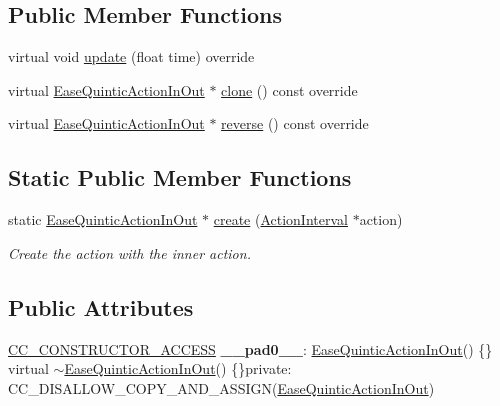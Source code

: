 \subsection*{Public Member Functions}
\begin{DoxyCompactItemize}
\item 
virtual void \hyperlink{classEaseQuinticActionInOut_ada59f8dcd6ba1daeaa1fb9d5b1087521}{update} (float time) override
\item 
virtual \hyperlink{classEaseQuinticActionInOut}{Ease\+Quintic\+Action\+In\+Out} $\ast$ \hyperlink{classEaseQuinticActionInOut_a526fb6329aaea716cd6af4ea53d2cc01}{clone} () const override
\item 
virtual \hyperlink{classEaseQuinticActionInOut}{Ease\+Quintic\+Action\+In\+Out} $\ast$ \hyperlink{classEaseQuinticActionInOut_a42cff7cafb10562b6e111274879f76bd}{reverse} () const override
\end{DoxyCompactItemize}
\subsection*{Static Public Member Functions}
\begin{DoxyCompactItemize}
\item 
static \hyperlink{classEaseQuinticActionInOut}{Ease\+Quintic\+Action\+In\+Out} $\ast$ \hyperlink{classEaseQuinticActionInOut_a1d6351b03e4ef3f840f70c94544501ec}{create} (\hyperlink{classActionInterval}{Action\+Interval} $\ast$action)
\begin{DoxyCompactList}\small\item\em Create the action with the inner action. \end{DoxyCompactList}\end{DoxyCompactItemize}
\subsection*{Public Attributes}
\begin{DoxyCompactItemize}
\item 
\mbox{\label{classEaseQuinticActionInOut_afa0d290b16940753cb7aa3fb4e3449be}} 
\hyperlink{_2cocos2d_2cocos_2base_2ccConfig_8h_a25ef1314f97c35a2ed3d029b0ead6da0}{C\+C\+\_\+\+C\+O\+N\+S\+T\+R\+U\+C\+T\+O\+R\+\_\+\+A\+C\+C\+E\+SS} {\bfseries \+\_\+\+\_\+pad0\+\_\+\+\_\+}\+: \hyperlink{classEaseQuinticActionInOut}{Ease\+Quintic\+Action\+In\+Out}() \{\} virtual $\sim$\hyperlink{classEaseQuinticActionInOut}{Ease\+Quintic\+Action\+In\+Out}() \{\}private\+: C\+C\+\_\+\+D\+I\+S\+A\+L\+L\+O\+W\+\_\+\+C\+O\+P\+Y\+\_\+\+A\+N\+D\+\_\+\+A\+S\+S\+I\+GN(\hyperlink{classEaseQuinticActionInOut}{Ease\+Quintic\+Action\+In\+Out})
\end{DoxyCompactItemize}
